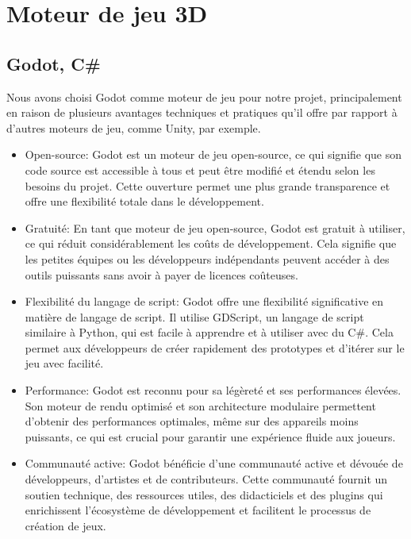 \documentclass[
	article,			%
	11pt,				%
	oneside,			%
	a4paper,			%
	chapter=TITLE,
	french,			%
	sumario=tradicional
	]{base_nt}
\begin{document}
\newpage

\section{Moteur de jeu 3D}

\subsection{Godot, C\#}

Nous avons choisi Godot comme moteur de jeu pour notre projet, principalement en raison de plusieurs avantages techniques et pratiques qu'il offre par rapport à d'autres moteurs de jeu, comme Unity, par exemple.

\begin{itemize}
    \item Open-source: Godot est un moteur de jeu open-source, ce qui signifie que son code source est accessible à tous et peut être modifié et étendu selon les besoins du projet. Cette ouverture permet une plus grande transparence et offre une flexibilité totale dans le développement.
    \item Gratuité: En tant que moteur de jeu open-source, Godot est gratuit à utiliser, ce qui réduit considérablement les coûts de développement. Cela signifie que les petites équipes ou les développeurs indépendants peuvent accéder à des outils puissants sans avoir à payer de licences coûteuses.
    \item Flexibilité du langage de script: Godot offre une flexibilité significative en matière de langage de script. Il utilise GDScript, un langage de script similaire à Python, qui est facile à apprendre et à utiliser avec du C\#. Cela permet aux développeurs de créer rapidement des prototypes et d'itérer sur le jeu avec facilité.
    \item Performance: Godot est reconnu pour sa légèreté et ses performances élevées. Son moteur de rendu optimisé et son architecture modulaire permettent d'obtenir des performances optimales, même sur des appareils moins puissants, ce qui est crucial pour garantir une expérience fluide aux joueurs.
    \item Communauté active: Godot bénéficie d'une communauté active et dévouée de développeurs, d'artistes et de contributeurs. Cette communauté fournit un soutien technique, des ressources utiles, des didacticiels et des plugins qui enrichissent l'écosystème de développement et facilitent le processus de création de jeux.
\end{itemize}
\end{document}
